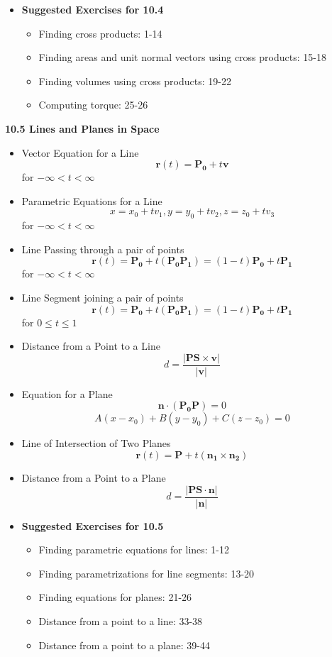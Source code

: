 \documentclass[12pt]{article}
\renewcommand{\vec}[1]{\mathbf{#1}}
\newcommand{\<}{\left<}
\renewcommand{\>}{\right>}
\begin{document}
\begin{itemize}
    \item \textbf{Suggested Exercises for 10.4}
      \begin{itemize}
      \item Finding cross products: 1-14
      \item Finding areas and unit normal vectors using cross products: 15-18
      \item Finding volumes using cross products: 19-22
      \item Computing torque: 25-26
      \end{itemize}
    \end{itemize}

\newpage

\centerline{\bf 10.5 Lines and Planes in Space}
  
    \begin{itemize}
    \item Vector Equation for a Line
      \[\vec{r}(t) = \vec{P_0} + t\vec{v}\] for $-\infty < t < \infty$
    
    \item Parametric Equations for a Line
      \[x = x_0 + tv_1, y = y_0 + tv_2, z = z_0 + tv_3\] for $-\infty < t < \infty$
    
    \item Line Passing through a pair of points
      \[\vec{r}(t) = \vec{P_0} + t(\vec{P_0P_1})=(1-t)\vec{P_0}+t\vec{P_1}\] for $-\infty < t < \infty$
    
    \item Line Segment joining a pair of points
      \[\vec{r}(t) = \vec{P_0} + t(\vec{P_0P_1})=(1-t)\vec{P_0}+t\vec{P_1}\] for $0 \leq t \leq 1$
    
    \item Distance from a Point to a Line
      \[d = \frac{|\vec{PS} \times \vec{v}|}{|\vec{v}|}\]
    
    \item Equation for a Plane
      \[\vec{n} \cdot (\vec{P_0}\vec{P}) = 0\] 
      \[A(x-x_0) + B(y-y_0) + C(z-z_0) = 0\] 
    
    \item Line of Intersection of Two Planes
      \[\vec{r}(t) = \vec{P} + t(\vec{n_1} \times \vec{n_2})\]
    
    \item Distance from a Point to a Plane
      \[d = \frac{|\vec{PS} \cdot \vec{n}|}{|\vec{n}|}\]
\newpage
    \item \textbf{Suggested Exercises for 10.5}
      \begin{itemize}
      \item Finding parametric equations for lines: 1-12
      \item Finding parametrizations for line segments: 13-20
      \item Finding equations for planes: 21-26
      \item Distance from a point to a line: 33-38
      \item Distance from a point to a plane: 39-44
      \end{itemize}
    
    \end{itemize}
\end{document}
